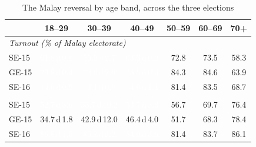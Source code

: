 \begin{table}[!htb]
\caption{The Malay reversal by age band, across the three elections}
\label{tab:malay}
\par\vspace{3pt}
\footnotesize\setlength{\tabcolsep}{3.2pt}
\begin{tabular}{lcccccc}
\toprule
 & 18--29 & 30--39 & 40--49 & 50--59 & 60--69 & 70+ \\
\midrule
\multicolumn{7}{l}{\textit{Turnout (\% of Malay electorate)}}\\[1pt]
\quad SE-15 & \cellcolor[HTML]{4493C7}\textcolor{white}{61.8\,{\tiny\textsf{d}\,}0.8} & \cellcolor[HTML]{58A1CF}\textcolor{white}{55.9\,{\tiny\textsf{d}\,}2.7} & \cellcolor[HTML]{3F8FC5}\textcolor{white}{63.3\,{\tiny\textsf{d}\,}0.2} & 72.8 & 73.5 & 58.3 \\
\quad GE-15 & \cellcolor[HTML]{1764AB}\textcolor{white}{79.8\,{\tiny\textsf{d}\,}0.4} & \cellcolor[HTML]{2474B7}\textcolor{white}{73.8\,{\tiny\textsf{d}\,}2.9} & \cellcolor[HTML]{1A68AE}\textcolor{white}{78.5\,{\tiny\textsf{d}\,}0.3} & 84.3 & 84.6 & 63.9 \\
\quad SE-16 & \cellcolor[HTML]{2171B5}\textcolor{white}{74.6\,{\tiny\textsf{d}\,}0.9} & \cellcolor[HTML]{2575B7}\textcolor{white}{73.1\,{\tiny\textsf{d}\,}0.8} & \cellcolor[HTML]{2373B6}\textcolor{white}{74.0\,{\tiny\textsf{d}\,}1.4} & 81.4 & 83.5 & 68.7 \\
\addlinespace[3pt]
\multicolumn{7}{l}{\textit{BN (\% of Malay ballots)}}\\[1pt]
\quad SE-15 & \cellcolor[HTML]{63A8D3}\textcolor{white}{52.7\,{\tiny\textsf{d}\,}3.6} & \cellcolor[HTML]{5FA6D1}\textcolor{white}{53.7\,{\tiny\textsf{d}\,}10.2} & \cellcolor[HTML]{5FA6D1}\textcolor{white}{53.7\,{\tiny\textsf{d}\,}3.3} & 56.7 & 69.7 & 76.4 \\
\quad GE-15 & \cellcolor[HTML]{A8CEE4}34.7\,{\tiny\textsf{d}\,}1.8 & \cellcolor[HTML]{89BEDC}42.9\,{\tiny\textsf{d}\,}12.0 & \cellcolor[HTML]{7AB6D9}46.4\,{\tiny\textsf{d}\,}4.0 & 51.7 & 68.3 & 78.4 \\
\quad SE-16 & \cellcolor[HTML]{09529D}\textcolor{white}{86.8\,{\tiny\textsf{d}\,}1.5} & \cellcolor[HTML]{0B559F}\textcolor{white}{85.7\,{\tiny\textsf{d}\,}3.2} & \cellcolor[HTML]{0E59A2}\textcolor{white}{84.0\,{\tiny\textsf{d}\,}3.6} & 81.4 & 83.7 & 86.1 \\

\end{tabular}
\end{table}
